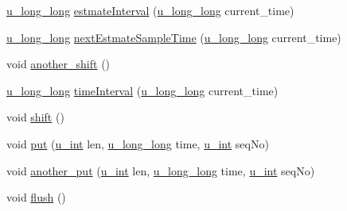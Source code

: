 \begin{DoxyCompactItemize}
\hyperlink{split__tcp__gateway_8h_ae16666ecf73bb70201bc64a6ccc329f1}{u\-\_\-long\-\_\-long} \hyperlink{structSlideWindow_aaacd6e9090b5f22e15ca5fdf2b4a2953}{estmate\-Interval} (\hyperlink{split__tcp__gateway_8h_ae16666ecf73bb70201bc64a6ccc329f1}{u\-\_\-long\-\_\-long} current\-\_\-time)
\item 
\hyperlink{split__tcp__gateway_8h_ae16666ecf73bb70201bc64a6ccc329f1}{u\-\_\-long\-\_\-long} \hyperlink{structSlideWindow_ad5e297c278c4e9a4eb3b94ed04ef50a8}{next\-Estmate\-Sample\-Time} (\hyperlink{split__tcp__gateway_8h_ae16666ecf73bb70201bc64a6ccc329f1}{u\-\_\-long\-\_\-long} current\-\_\-time)
\item 
void \hyperlink{structSlideWindow_ac2fb850f95b80f16f097d87a98e4c2d9}{another\-\_\-shift} ()
\item 
\hyperlink{split__tcp__gateway_8h_ae16666ecf73bb70201bc64a6ccc329f1}{u\-\_\-long\-\_\-long} \hyperlink{structSlideWindow_a70a3e8ddc79035834c9afbbc3b1564dc}{time\-Interval} (\hyperlink{split__tcp__gateway_8h_ae16666ecf73bb70201bc64a6ccc329f1}{u\-\_\-long\-\_\-long} current\-\_\-time)
\item 
void \hyperlink{structSlideWindow_afdf1309621516515ab3c0aa382d7d968}{shift} ()
\item 
void \hyperlink{structSlideWindow_ab6a270ae70611ba0c8f4d84a0ff05bc9}{put} (\hyperlink{split__tcp__gateway_8h_ac319c165d52643e43249fe003e18bdf3}{u\-\_\-int} len, \hyperlink{split__tcp__gateway_8h_ae16666ecf73bb70201bc64a6ccc329f1}{u\-\_\-long\-\_\-long} time, \hyperlink{split__tcp__gateway_8h_ac319c165d52643e43249fe003e18bdf3}{u\-\_\-int} seq\-No)
\item 
void \hyperlink{structSlideWindow_adc22f3475c302f74a9cfe4e9a005bc3d}{another\-\_\-put} (\hyperlink{split__tcp__gateway_8h_ac319c165d52643e43249fe003e18bdf3}{u\-\_\-int} len, \hyperlink{split__tcp__gateway_8h_ae16666ecf73bb70201bc64a6ccc329f1}{u\-\_\-long\-\_\-long} time, \hyperlink{split__tcp__gateway_8h_ac319c165d52643e43249fe003e18bdf3}{u\-\_\-int} seq\-No)
\item 
void \hyperlink{structSlideWindow_aa0097fa63e6d837a8ae73168f819fa91}{flush} ()
\end{DoxyCompactItemize}
